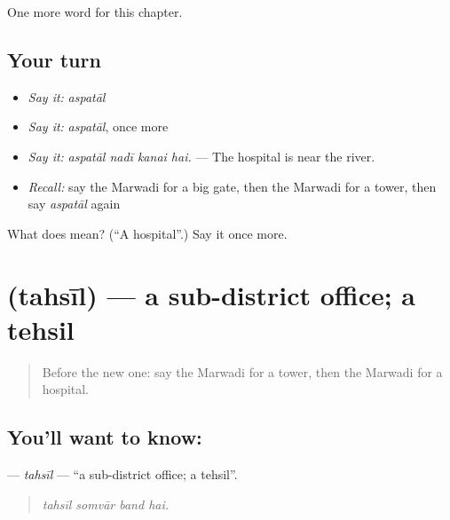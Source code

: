 \begin{grammarlens}[title={What you've built}]
One more word for this chapter.
\end{grammarlens}

\subsection*{Your turn}
\begin{itemize}
\raggedright
  \item \emph{Say it:} \emph{aspatāl}
  \item \emph{Say it:} \emph{aspatāl}, once more
  \item \emph{Say it:} \emph{aspatāl nadī kanai hai.} — The hospital is near the river.
  \item \emph{Recall:} say the Marwadi for a big gate, then the Marwadi for a tower, then say \emph{aspatāl} again
\end{itemize}

\begin{tcolorbox}[breakable,colback=teal!4,colframe=teal!35!black,title={Before you move on}]
What does  mean? (\textquotedblleft{}A hospital\textquotedblright{}.) Say it once more.
\end{tcolorbox}
\section[\texorpdfstring{\mw{तहसील} (tahsīl)}{तहसील (tahsīl)}]{ (tahsīl) — a sub-district office; a tehsil}

\label{lesson:MW-C208-tahsil}



\begin{quote}
Before the new one: say the Marwadi for a tower, then the Marwadi for a hospital.
\end{quote}

\subsection*{You'll want to know: }
\textbf{} — \emph{tahsīl} — \textquotedblleft{}a sub-district office; a tehsil\textquotedblright{}.

\begin{quote}
   
\end{quote}

\begin{quote}
\emph{tahsīl somvār band hai.}
\end{quote}

